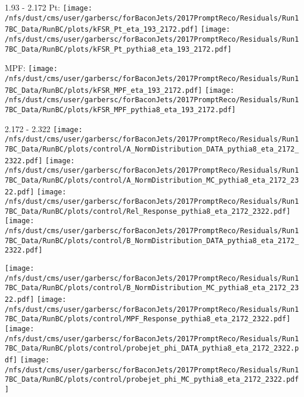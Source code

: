 \documentclass[t,compress]{beamer}
\begin{document}
\begin{frame}{1.93 - 2.172}
	 Pt: \texttt{[image: /nfs/dust/cms/user/garbersc/forBaconJets/2017PromptReco/Residuals/Run17BC\_Data/RunBC/plots/kFSR\_Pt\_eta\_193\_2172.pdf]}
	\texttt{[image: /nfs/dust/cms/user/garbersc/forBaconJets/2017PromptReco/Residuals/Run17BC\_Data/RunBC/plots/kFSR\_Pt\_pythia8\_eta\_193\_2172.pdf]}
\newline

	 MPF: \texttt{[image: /nfs/dust/cms/user/garbersc/forBaconJets/2017PromptReco/Residuals/Run17BC\_Data/RunBC/plots/kFSR\_MPF\_eta\_193\_2172.pdf]}
	\texttt{[image: /nfs/dust/cms/user/garbersc/forBaconJets/2017PromptReco/Residuals/Run17BC\_Data/RunBC/plots/kFSR\_MPF\_pythia8\_eta\_193\_2172.pdf]}
\end{frame}

\begin{frame}{2.172 - 2.322}
	\texttt{[image: /nfs/dust/cms/user/garbersc/forBaconJets/2017PromptReco/Residuals/Run17BC\_Data/RunBC/plots/control/A\_NormDistribution\_DATA\_pythia8\_eta\_2172\_2322.pdf]}
	\texttt{[image: /nfs/dust/cms/user/garbersc/forBaconJets/2017PromptReco/Residuals/Run17BC\_Data/RunBC/plots/control/A\_NormDistribution\_MC\_pythia8\_eta\_2172\_2322.pdf]}
	\texttt{[image: /nfs/dust/cms/user/garbersc/forBaconJets/2017PromptReco/Residuals/Run17BC\_Data/RunBC/plots/control/Rel\_Response\_pythia8\_eta\_2172\_2322.pdf]}
	\texttt{[image: /nfs/dust/cms/user/garbersc/forBaconJets/2017PromptReco/Residuals/Run17BC\_Data/RunBC/plots/control/B\_NormDistribution\_DATA\_pythia8\_eta\_2172\_2322.pdf]}
\newline

	\texttt{[image: /nfs/dust/cms/user/garbersc/forBaconJets/2017PromptReco/Residuals/Run17BC\_Data/RunBC/plots/control/B\_NormDistribution\_MC\_pythia8\_eta\_2172\_2322.pdf]}
	\texttt{[image: /nfs/dust/cms/user/garbersc/forBaconJets/2017PromptReco/Residuals/Run17BC\_Data/RunBC/plots/control/MPF\_Response\_pythia8\_eta\_2172\_2322.pdf]}
	\texttt{[image: /nfs/dust/cms/user/garbersc/forBaconJets/2017PromptReco/Residuals/Run17BC\_Data/RunBC/plots/control/probejet\_phi\_DATA\_pythia8\_eta\_2172\_2322.pdf]}
	\texttt{[image: /nfs/dust/cms/user/garbersc/forBaconJets/2017PromptReco/Residuals/Run17BC\_Data/RunBC/plots/control/probejet\_phi\_MC\_pythia8\_eta\_2172\_2322.pdf]}
\end{frame}
\end{document}
